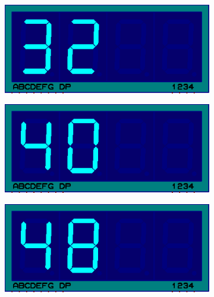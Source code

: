 \documentclass{lab_sheet}
\begin{document}
\begin{figure}[H]
\begin{subfigure}{.33\textwidth}
              \label{fig:prob4-c}
              \caption{}
            \end{subfigure}
            \newline
            \begin{subfigure}{.33\textwidth}
              \centering
              \includegraphics[frame,width=.9\linewidth]{../Figures/m32}     
              \caption{}
              \label{fig:prob4-d}
            \end{subfigure}
            \begin{subfigure}{.33\textwidth}
              \centering
              \includegraphics[frame,width=.9\linewidth]{../Figures/m40}   
              \caption{}
              \label{fig:prob4-e}
            \end{subfigure}
            \begin{subfigure}{.33\textwidth}
              \centering
              \includegraphics[frame,width=.9\linewidth]{../Figures/m48}   
              \caption{}
              \label{fig:prob4-f}

\end{subfigure}
\end{figure}
\end{document}
